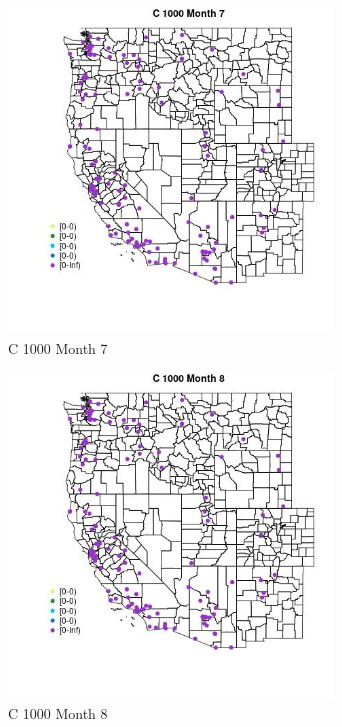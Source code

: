 \begin{figure} 
\centering  
\includegraphics[width=0.77\textwidth]{Code_Outputs/Report_ML_input_PM25_Step4_part_e_de_duplicated_aves_MapObsMo7C_1000.jpg} 
\caption{\label{fig:Report_ML_input_PM25_Step4_part_e_de_duplicated_avesMapObsMo7C_1000}C 1000 Month 7} 
\end{figure} 
 

\clearpage 

\begin{figure} 
\centering  
\includegraphics[width=0.77\textwidth]{Code_Outputs/Report_ML_input_PM25_Step4_part_e_de_duplicated_aves_MapObsMo8C_1000.jpg} 
\caption{\label{fig:Report_ML_input_PM25_Step4_part_e_de_duplicated_avesMapObsMo8C_1000}C 1000 Month 8} 
\end{figure} 
 

